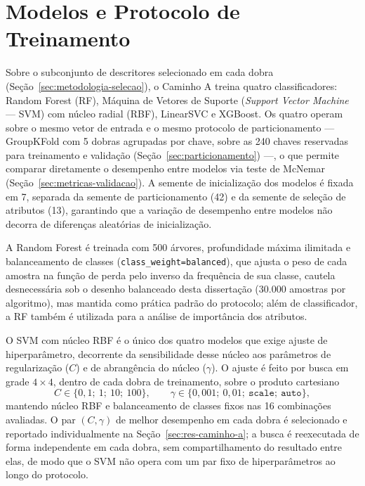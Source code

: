 \section{Modelos e Protocolo de Treinamento}
\label{sec:modelos-protocolo}

Sobre o subconjunto de descritores selecionado em cada dobra (Seção~\ref{sec:metodologia-selecao}), o Caminho A treina quatro classificadores: Random Forest (RF), Máquina de Vetores de Suporte (\emph{Support Vector Machine} --- SVM) com núcleo radial (RBF), LinearSVC e XGBoost. Os quatro operam sobre o mesmo vetor de entrada e o mesmo protocolo de particionamento --- GroupKFold com 5 dobras agrupadas por chave, sobre as 240 chaves reservadas para treinamento e validação (Seção~\ref{sec:particionamento}) ---, o que permite comparar diretamente o desempenho entre modelos via teste de McNemar (Seção~\ref{sec:metricas-validacao}). A semente de inicialização dos modelos é fixada em 7, separada da semente de particionamento (42) e da semente de seleção de atributos (13), garantindo que a variação de desempenho entre modelos não decorra de diferenças aleatórias de inicialização.

A Random Forest é treinada com 500 árvores, profundidade máxima ilimitada e balanceamento de classes (\texttt{class\_weight=balanced}), que ajusta o peso de cada amostra na função de perda pelo inverso da frequência de sua classe, cautela desnecessária sob o desenho balanceado desta dissertação (30.000 amostras por algoritmo), mas mantida como prática padrão do protocolo; além de classificador, a RF também é utilizada para a análise de importância dos atributos.

O SVM com núcleo RBF é o único dos quatro modelos que exige ajuste de hiperparâmetro, decorrente da sensibilidade desse núcleo aos parâmetros de regularização ($C$) e de abrangência do núcleo ($\gamma$). O ajuste é feito por busca em grade $4\times4$, dentro de cada dobra de treinamento, sobre o produto cartesiano
\begin{equation}
C \in \{0{,}1;\ 1;\ 10;\ 100\}, \qquad \gamma \in \{0{,}001;\ 0{,}01;\ \texttt{scale};\ \texttt{auto}\},
\end{equation}
mantendo núcleo RBF e balanceamento de classes fixos nas 16 combinações avaliadas. O par $(C,\gamma)$ de melhor desempenho em cada dobra é selecionado e reportado individualmente na Seção~\ref{sec:res-caminho-a}; a busca é reexecutada de forma independente em cada dobra, sem compartilhamento do resultado entre elas, de modo que o SVM não opera com um par fixo de hiperparâmetros ao longo do protocolo.

